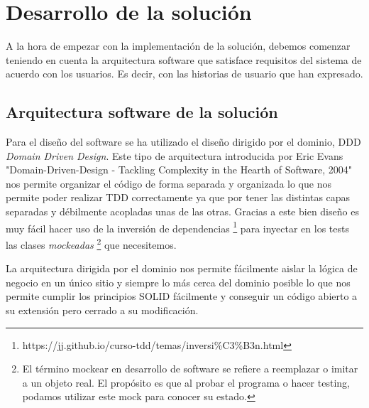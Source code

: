 \chapter{Desarrollo de la solución}
A la hora de empezar con la implementación de la solución, debemos comenzar teniendo en cuenta la arquitectura software que satisface requisitos del sistema de acuerdo con los usuarios. Es decir, con las historias de usuario que han expresado.

\section{Arquitectura software de la solución}
Para el diseño del software se ha utilizado el diseño dirigido por el dominio, DDD \textit{Domain Driven Design}. Este tipo de arquitectura introducida por Eric Evans \cite{ddd_book} "Domain-Driven-Design - Tackling Complexity in the Hearth of Software, 2004" nos permite organizar el código de forma separada y organizada lo que nos permite poder realizar TDD correctamente ya que por tener las distintas capas separadas y débilmente acopladas unas de las otras. Gracias a este bien diseño es muy fácil hacer uso de la inversión de dependencias \footnote{https://jj.github.io/curso-tdd/temas/inversi\%C3\%B3n.html} para inyectar en los tests las clases \textit{mockeadas} \footnote{El término mockear en desarrollo de software se refiere a reemplazar o imitar a un objeto real. El propósito es que al probar el programa o hacer testing, podamos utilizar este mock para conocer su estado.} que necesitemos. 

La arquitectura dirigida por el dominio nos permite fácilmente aislar la lógica de negocio en un único sitio y siempre lo más cerca del dominio posible lo que nos permite cumplir los principios SOLID fácilmente y conseguir un código abierto a su extensión pero cerrado a su modificación.  

